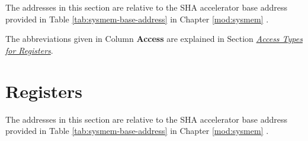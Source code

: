 \documentclass[main\_\_EN.tex]{subfiles}
\begin{document}
The addresses in this section are relative to the SHA accelerator base address provided in Table \ref{tab:sysmem-base-address} in Chapter \ref{mod:sysmem} \textit{}.

The abbreviations given in Column \textbf{Access} are explained in Section \hyperref[glossary-access-types]{\textit{Access Types for Registers}}.



\section{Registers}

The addresses in this section are relative to the SHA accelerator base address provided in Table \ref{tab:sysmem-base-address} in Chapter \ref{mod:sysmem} \textit{}.


\end{document}
